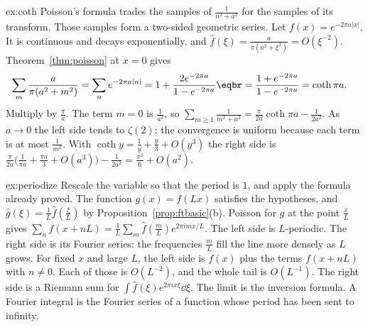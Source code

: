 \begin{solution}{ex:coth}
\idea Poisson's formula trades the samples of $\frac1{n^2+a^2}$ for the samples of its transform. Those samples form a two-sided geometric series.
\writeup Let $f(x)=e^{-2\pi a|x|}$. It is continuous and decays exponentially, and $\hat f(\xi)=\frac a{\pi(a^2+\xi^2)}=O(\xi^{-2})$. Theorem~\ref{thm:poisson} at $x=0$ gives
\[
\begin{aligned}\sum_m\frac a{\pi(a^2+m^2)}&=\sum_ne^{-2\pi a|n|}=1+\frac{2e^{-2\pi a}}{1-e^{-2\pi a}}\eqbr=\frac{1+e^{-2\pi a}}{1-e^{-2\pi a}}=\coth\pi a.\end{aligned}
\]
Multiply by $\frac\pi a$. The term $m=0$ is $\frac1{a^2}$, so $\sum_{m\ge1}\frac1{m^2+a^2}=\frac\pi{2a}\coth\pi a-\frac1{2a^2}$. As $a\to0$ the left side tends to $\zeta(2)$: the convergence is uniform because each term is at most $\frac1{m^2}$. With $\coth y=\frac1y+\frac y3+O(y^3)$ the right side is $\frac\pi{2a}\bigl(\frac1{\pi a}+\frac{\pi a}3+O(a^3)\bigr)-\frac1{2a^2}=\frac{\pi^2}6+O(a^2)$.
\end{solution}

\begin{solution}{ex:periodize}
\idea Rescale the variable so that the period is $1$, and apply the formula already proved.
\writeup The function $g(x)=f(Lx)$ satisfies the hypotheses, and $\hat g(\xi)=\frac1L\hat f(\frac\xi L)$ by Proposition~\ref{prop:ftbasic}(b). Poisson for $g$ at the point $\frac xL$ gives $\sum_nf(x+nL)=\frac1L\sum_m\hat f(\frac mL)e^{2\pi imx/L}$. The left side is $L$-periodic. The right side is its Fourier series: the frequencies $\frac mL$ fill the line more densely as $L$ grows. For fixed $x$ and large $L$, the left side is $f(x)$ plus the terms $f(x+nL)$ with $n\ne0$. Each of those is $O(L^{-2})$, and the whole tail is $O(L^{-1})$. The right side is a Riemann sum for $\int\hat f(\xi)e^{2\pi ix\xi}\dd\xi$. The limit is the inversion formula. A Fourier integral is the Fourier series of a function whose period has been sent to infinity.
\end{solution}

